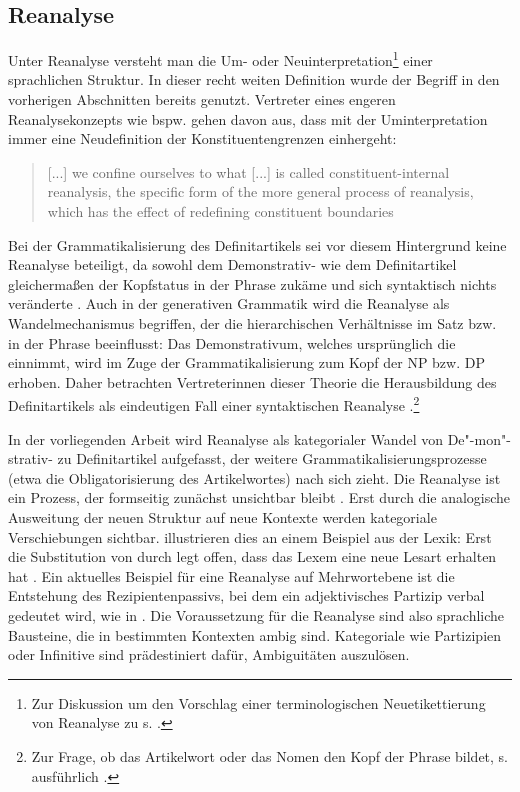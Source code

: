\subsection{Reanalyse}\label{sec:reanalyse}

Unter Reanalyse versteht man die Um- oder Neuinterpretation\footnote{Zur Diskussion um den Vorschlag einer terminologischen Neuetikettierung von Reanalyse zu  s.  \textcite[36]{Traugott2013}.} einer sprachlichen Struktur. In dieser recht weiten Definition wurde der Begriff in den vorherigen Abschnitten bereits genutzt. Vertreter eines engeren Reanalysekonzepts wie bspw. \textcite[215]{Heine1991} gehen davon aus, dass mit der Uminterpretation immer eine Neudefinition der Konstituentengrenzen einhergeht: \blockcquote[216]{Heine1991}{[...] we confine ourselves to what [...] is called constituent-internal reanalysis, the specific form of the more general process of reanalysis, which has the effect of redefining constituent boundaries}. Bei der Grammatikalisierung des Definitartikels sei vor diesem Hintergrund keine Reanalyse  beteiligt, da sowohl dem Demonstrativ- wie dem Definitartikel gleichermaßen der Kopfstatus in der Phrase zukäme und sich syntaktisch nichts veränderte \parencite[219]{Heine1991}. Auch in der generativen Grammatik wird die Reanalyse als Wandelmechanismus begriffen, der die hierarchischen Verhältnisse im Satz bzw. in der Phrase beeinflusst: Das Demonstrativum, welches ursprünglich die  einnimmt, wird im Zuge der Grammatikalisierung zum Kopf der NP bzw. DP erhoben. Daher betrachten Vertreterinnen dieser Theorie die Herausbildung des Definitartikels als eindeutigen Fall einer syntaktischen Reanalyse \parencite[vgl. bspw.][]{Philippi1997,vanGelderen2007}.\footnote{Zur Frage, ob das Artikelwort oder das Nomen den Kopf der Phrase bildet, s. ausführlich \textcite[145-146]{Himmelmann1997}.}

In der vorliegenden Arbeit wird Reanalyse als kategorialer Wandel von De"-mon"-strativ- zu Definitartikel aufgefasst, der weitere Grammatikalisierungsprozesse (etwa die Obligatorisierung des Artikelwortes) nach sich zieht. Die Reanalyse ist ein Prozess, der formseitig zunächst unsichtbar bleibt \parencite[58]{Langacker1977}. Erst durch die analogische Ausweitung der neuen Struktur auf neue Kontexte werden kategoriale Verschiebungen sichtbar. \textcite[50]{Hopper2006} illustrieren dies an einem Beispiel aus der Lexik: Erst die Substitution von  durch  legt offen, dass das Lexem  eine neue Lesart erhalten hat \parencite[urspr. ][389]{Kluge2011}. Ein aktuelles Beispiel für eine Reanalyse auf Mehrwortebene ist die Entstehung des Rezipientenpassivs, bei dem ein adjektivisches Partizip verbal gedeutet wird, wie in  \parencite[152-153]{Szczepaniak2011a}.
Die Voraussetzung für die Reanalyse sind also sprachliche Bausteine, die in bestimmten Kontexten ambig sind. Kategoriale  wie Partizipien oder Infinitive \parencite[vgl. die Reanalyse des -Progressivs: Aus einem nominalen wird ein verbaler Infinitiv, s.][]{Flick2013} sind prädestiniert dafür, Ambiguitäten auszulösen. 

